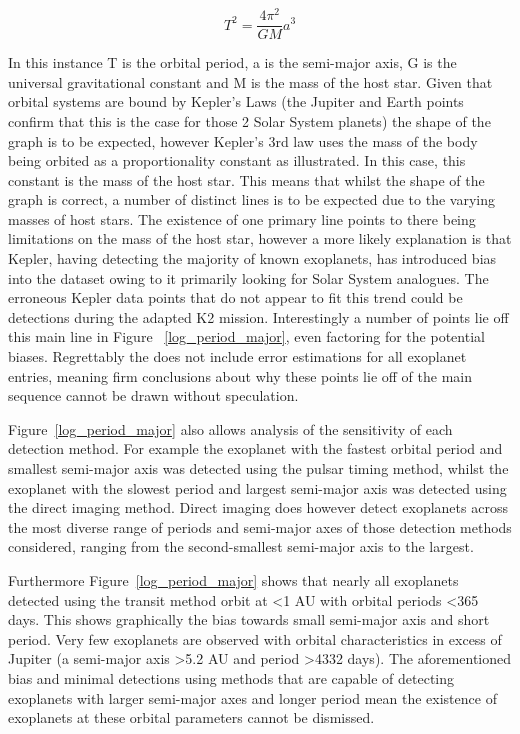 \documentclass{report}
\begin{document}
\begin{equation} \label{Kepler}
    T^{2} = \frac{4\pi^2}{GM} a^{3} 
\end{equation}

In this instance T is the orbital period, a is the semi-major axis, G is the universal gravitational constant and M is the mass of the host star. Given that orbital systems are bound by Kepler's Laws (the Jupiter and Earth points confirm that this is the case for those 2 Solar System planets) the shape of the graph is to be expected, however Kepler's 3rd law uses the mass of the body being orbited as a proportionality constant as illustrated. In this case, this constant is the mass of the host star. This means that whilst the shape of the graph is correct, a number of distinct lines is to be expected due to the varying masses of host stars. The existence of one primary line points to there being limitations on the mass of the host star, however a more likely explanation is that Kepler, having detecting the majority of known exoplanets, has introduced bias into the dataset owing to it primarily looking for Solar System analogues. The erroneous Kepler data points that do not appear to fit this trend could be detections during the adapted K2 mission. Interestingly a number of points lie off this main line in Figure ~\ref{log_period_major}, even factoring for the potential biases. Regrettably the \textcite{exo} does not include error estimations for all exoplanet entries, meaning firm conclusions about why these points lie off of the main sequence cannot be drawn without speculation.

Figure~\ref{log_period_major} also allows analysis of the sensitivity of each detection method. For example the exoplanet with the fastest orbital period and smallest semi-major axis was detected using the pulsar timing method, whilst the exoplanet with the slowest period and largest semi-major axis was detected using the direct imaging method. Direct imaging does however detect exoplanets across the most diverse range of periods and semi-major axes of those detection methods considered, ranging from the second-smallest semi-major axis to the largest.

Furthermore Figure~\ref{log_period_major} shows that nearly all exoplanets detected using the transit method orbit at \textless 1 AU with orbital periods \textless 365 days. This shows graphically the bias towards small semi-major axis and short period. Very few exoplanets are observed with orbital characteristics in excess of Jupiter (a semi-major axis \textgreater 5.2 AU and period \textgreater 4332 days). The aforementioned bias and minimal detections using methods that are capable of detecting exoplanets with larger semi-major axes and longer period mean the existence of exoplanets at these orbital parameters cannot be dismissed.
\end{document}
